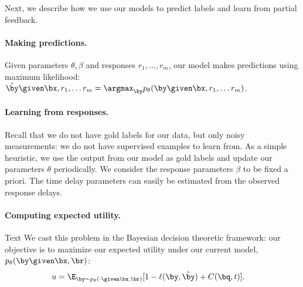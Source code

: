 Next, we describe how we use our models to predict labels and learn from partial feedback.

\paragraph{Making predictions.}
Given parameters $\theta, \beta$ and responses $r_1, \ldots, r_m$, our model makes predictions using maximum likelihood:
$\byt \given \bx, r_1, \ldots r_m = \argmax_{\by} \p(\by \given \bx, r_1, \ldots r_m)$.

\paragraph{Learning from responses.}
Recall that we do not have gold labels for our data, but only noisy measurements: we do not have supervised examples to learn from. 
As a simple heuristic, we use the output from our model as gold labels and update our parameters $\theta$ periodically.  
We consider the response parameters $\beta$ to be fixed a priori.
The time delay parameters can easily be estimated from the observed response delays.

\paragraph{Computing expected utility.}

\ac{Text}
We cast this problem in the Bayesian decision theoretic framework: our objective is to maximize our expected utility under our current model,
$\p(\by \given \bx, \br)$:
\begin{align*}
  u &= \E_{\by \sim \p(\cdot \given \bx, \br)}[1 - \ell(\by, \byt) + C(\bq, t)].
\end{align*}

